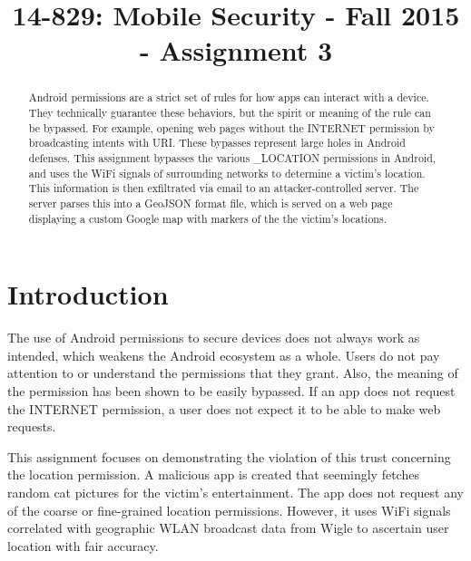 \documentclass[conference,compsoc]{IEEEtran}
\begin{document}
\title{14-829: Mobile Security - Fall 2015 - Assignment 3}
\author{
}
\maketitle














\begin{abstract}
Android permissions are a strict set of rules for how apps can interact with a device. They technically guarantee these behaviors, but the spirit or meaning of the rule can be bypassed. For example, opening web pages without the INTERNET permission by broadcasting intents with URI. These bypasses represent large holes in Android defenses. This assignment bypasses the various \*\_LOCATION permissions in Android, and uses the WiFi signals of surrounding networks to determine a victim's location. This information is then exfiltrated via email to an attacker-controlled server. The server parses this into a GeoJSON format file, which is served on a web page displaying a custom Google map with markers of the the victim's locations.
\end{abstract}


\section{Introduction}
The use of Android permissions to secure devices does not always work as intended, which weakens the Android ecosystem as a whole. Users do not pay attention to or understand the permissions that they grant\cite{Felt:2012:APU:2335356.2335360}. Also, the meaning of the permission has been shown to be easily bypassed\cite{egners2012messing}. If an app does not request the INTERNET permission, a user does not expect it to be able to make web requests.

This assignment focuses on demonstrating the violation of this trust concerning the location permission. A malicious app is created that seemingly fetches random cat pictures for the victim's entertainment\cite{thecatapi}. The app does not request any of the coarse or fine-grained location permissions. However, it uses WiFi signals correlated with geographic WLAN broadcast data from Wigle\cite{wigle} to ascertain user location with fair accuracy.
\end{document}
